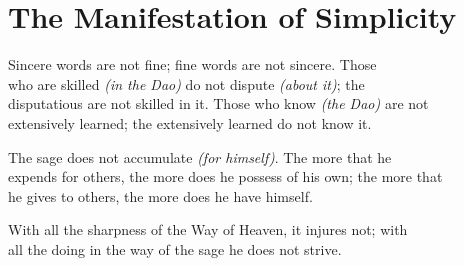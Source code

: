 \section*{The Manifestation of Simplicity}
    Sincere words are not fine; fine words are not sincere. Those\\
    who are skilled \textit{(in the Dao)} do not dispute \textit{(about it)}; the\\
    disputatious are not skilled in it. Those who know \textit{(the Dao)} are not\\
    extensively learned; the extensively learned do not know it.\vspace{\baselineskip}
    
    The sage does not accumulate \textit{(for himself)}. The more that he\\
    expends for others, the more does he possess of his own; the more that\\
    he gives to others, the more does he have himself.\vspace{\baselineskip}
    
    With all the sharpness of the Way of Heaven, it injures not; with\\
    all the doing in the way of the sage he does not strive.\\
